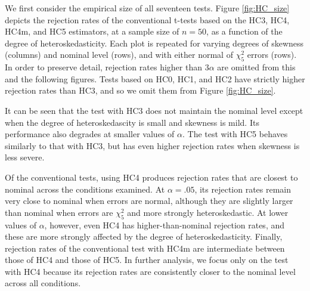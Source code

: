 \documentclass[12pt]{article}\usepackage[]{graphicx}\usepackage[]{color}
\begin{document}
We first consider the empirical size of all seventeen tests. Figure \ref{fig:HC_size} depicts the rejection rates of the conventional t-tests based on the HC3, HC4, HC4m, and HC5 estimators, at a sample size of $n = 50$, as a function of the degree of heteroskedasticity. Each plot is repeated for varying degrees of skewness (columns) and nominal level (rows), and with either normal of $\chi^2_5$ errors (rows). In order to preserve detail, rejection rates higher than $3\alpha$ are omitted from this and the following figures. Tests based on HC0, HC1, and HC2 have strictly higher rejection rates than HC3, and so we omit them from Figure \ref{fig:HC_size}. 

It can be seen that the test with HC3 does not maintain the nominal level except when the degree of heteroskedascity is small and skewness is mild. Its performance also degrades at smaller values of $\alpha$. The test with HC5 behaves similarly to that with HC3, but has even higher rejection rates when skewness is less severe. 

Of the conventional tests, using HC4 produces rejection rates that are closest to nominal across the conditions examined. At $\alpha = .05$, its rejection rates remain very close to nominal when errors are normal, although they are slightly larger than nominal when errors are $\chi^2_5$ and more strongly heteroskedastic. At lower values of $\alpha$, however, even HC4 has higher-than-nominal rejection rates, and these are more strongly affected by the degree of heteroskedasticity. Finally, rejection rates of the conventional test with HC4m are intermediate between those of HC4 and those of HC5. In further analysis, we focus only on the test with HC4 because its rejection rates are consistently closer to the nominal level across all conditions. 
\end{document}
